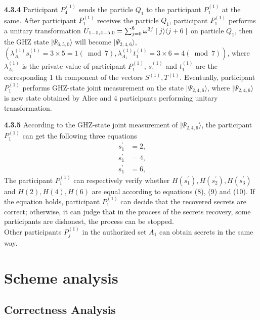 \documentclass[pdflatex,sn-mathphys]{sn-jnl}%
\theoremstyle{thmstyleone}%
\theoremstyle{thmstyletwo}%
\theoremstyle{thmstylethree}%
\begin{document}
\indent\textbf{4.3.4} Participant $P_4^{(1)}$ sends the particle $Q_1$ to the participant $P_1^{(1)}$ at the same. After participant $P_1^{(1)}$ receives the particle $Q_1$, participant $P_1^{(1)}$ performs a unitary transformation
 $U_{1-5,4-5,0}=\sum_{j=0}^{6} \omega^{3j}\mid{j}\rangle\langle{j+6}\mid\notag$ on particle $Q_1$, then the GHZ state $\mid\varPsi_{6,5,0}\rangle$ will become 
$\mid\varPsi_{2,4,6}\rangle$,  $(\lambda_{A_1}^{(1)}s_1^{(1)}=3\times5=1(\bmod{7}), \lambda_{A_1}^{(1)}t_1^{(1)}=3\times6=4(\bmod{7}))$, where $\lambda_{A_1}^{(1)}$ is the private value of participant $P_1^{(1)}$, $s_1^{(1)}$ and $t_1^{(1)}$ are the corresponding 1 th component of the vectors $S^{(1)},T^{(1)}$. Eventually, participant $P_1^{(1)}$ performs GHZ-state joint measurement on the state $\mid\varPsi_{2,4,6}\rangle$, where $\mid\varPsi_{2,4,6}\rangle$ is new state obtained by Alice and 4 participants performing unitary transformation.

\indent\textbf{4.3.5} According to the GHZ-state joint measurement of $\mid\varPsi_{2,4,6}\rangle$, the participant $P_1^{(1)}$ can get the following three equations
\begin{align}
 \ s_1^\prime &=2,\\
 \ s_1^\prime &=4,\\
 \ s_1^\prime &=6,
\end{align}
The participant $P_1^{(1)}$ can respectively verify whether $H(s_1^\prime),H(s_2^\prime),H(s_3^\prime)$ and $H(2),H(4),H(6)$ are equal according to equations (8), (9) and (10). If the equation holds, participant $P_1^{(1)}$ can decide that the recovered secrets are correct; otherwise, it can judge that in the process of the secrets recovery, some participants are dishonest, the process can be stopped.\\
\indent Other participants $P_j^{(1)}$ in the authorized set $A_1$ can obtain secrets in the same way.

\section{Scheme analysis}\label{sec5}

\subsection{Correctness Analysis}\label{subsec1}
\end{document}
